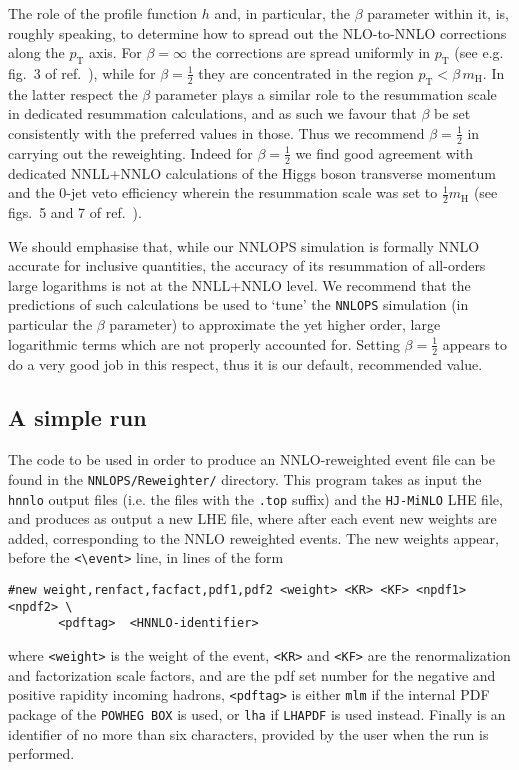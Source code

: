 \documentclass[11pt,a4paper]{article}
\newcommand{\noun}[1]{{\tt #1}}
\newcommand{\LHAPDF}{\noun{LHAPDF}}
\newcommand{\POWHEGBOX}{\noun{POWHEG BOX}}
\newcommand{\HJMINLO}{\noun{HJ-MiNLO}}
\newcommand{\HNNLO}{\noun{hnnlo}}
\newcommand{\NNLOPS}{\noun{NNLOPS}}
\newcommand{\pt}{p_{\scriptscriptstyle \mathrm{T}}}
\newcommand{\mh}{m_{\scriptscriptstyle \mathrm{H}}}
\newcommand{\hc}{\beta}
\begin{document}
The role of the profile function $h$ and, in particular, the $\hc$
parameter within it, is, roughly speaking, to determine how to spread out
the NLO-to-NNLO corrections along the $\pt$ axis. For
$\hc=\infty$ the corrections are spread uniformly in $\pt$ (see e.g.
fig.~3 of ref.~\cite{Hamilton:2013fea}), while for $\hc={\frac{1}{2}}$
they are concentrated in the region $\pt<\hc\,\mh$. In the latter
respect the $\hc$ parameter plays a similar role to the resummation
scale in dedicated resummation calculations, and as such we favour 
that $\hc$ be set consistently with the preferred values in those.
Thus we recommend $\hc={\frac{1}{2}}$ in carrying out the reweighting.
Indeed for $\hc={\frac{1}{2}}$ we find good agreement with dedicated
NNLL+NNLO calculations of the Higgs boson transverse momentum and the
0-jet veto efficiency wherein the resummation scale was set to
${\frac{1}{2}}\mh$ (see figs.~5 and 7 of ref.~\cite{Hamilton:2013fea}).

We should emphasise that, while our NNLOPS simulation is formally NNLO
accurate for inclusive quantities, the accuracy of its resummation of
all-orders large logarithms is not at the
NNLL+NNLO level. We recommend that the predictions of such calculations
be used to `tune' the \NNLOPS{} simulation (in particular the $\hc$
parameter) to approximate the yet higher order, large logarithmic terms
which are not properly accounted for. Setting $\hc={\frac{1}{2}}$ appears
to do a very good job in this respect, thus it is our default, recommended
value.

\subsection{A simple run\label{sec:simple-reweighting}} 

The code to be used in order to produce an NNLO-reweighted event file
can be found in the {\tt{NNLOPS/Reweighter/}} directory.
This program takes as input the \HNNLO{} output files (i.e. the
files with the {\tt .top} suffix) and the \HJMINLO{} LHE file, and
produces as output a new LHE file, where after each event new weights
are added, corresponding to the NNLO reweighted events. The new weights
appear, before the {\tt <\textbackslash{}event>} line,
in lines of the form
\begin{verbatim}
#new weight,renfact,facfact,pdf1,pdf2 <weight> <KR> <KF> <npdf1> <npdf2> \ 
       <pdftag>  <HNNLO-identifier>
\end{verbatim}
where  {\tt <weight>} is the weight of the event, {\tt <KR>} and {\tt <KF>}
are the renormalization and factorization scale factors, {\tt <npdf1>} and
{\tt  <npdf2>} are the pdf set number for the negative and positive rapidity
 incoming hadrons, {\tt <pdftag>} is either {\tt mlm}
if the internal PDF package of the \POWHEGBOX{} is used, or {\tt lha} if
\LHAPDF{} is used instead.
Finally  {\tt <HNNLO-identifier>} is an identifier of no more than six characters,
provided by the user when the run is performed.
\end{document}
